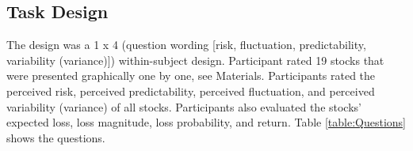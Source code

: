 \documentclass[a4paper,man, natbib,floatsintext]{apa6} %
\begin{document}
\subsection{Task Design}
The design was a 1 x 4 (question wording [risk, fluctuation, predictability, variability (variance)]) within-subject design. Participant rated 19 stocks that were presented graphically one by one, see Materials. Participants rated the perceived risk, perceived predictability, perceived fluctuation, and perceived variability (variance) of all stocks. Participants also evaluated the stocks' expected loss, loss magnitude, loss probability, and return. Table \ref{table:Questions} shows the questions.

\end{document}
